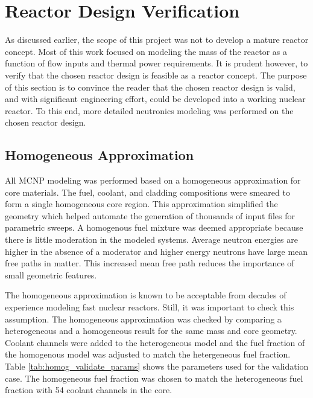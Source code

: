 \chapter{Reactor Design Verification}
    As discussed earlier, the scope of this project was not to develop a mature
reactor concept. Most of this work focused on modeling the mass of the
reactor as a function of flow inputs and thermal power requirements. It is
prudent however, to verify that the chosen reactor design is feasible as a
reactor concept. The purpose of this section is to convince the reader that
the chosen reactor design is valid, and with significant engineering effort,
could be developed into a working nuclear reactor. To this end, more detailed
neutronics modeling was performed on the chosen reactor design.

\section{Homogeneous Approximation}
All MCNP modeling was performed based on a homogeneous approximation for core
materials. The fuel, coolant, and cladding compositions were smeared to form a
single homogeneous core region. This approximation simplified the geometry which
helped automate the generation of thousands of input files for parametric
sweeps. A homogenous fuel mixture was deemed appropriate because there is little
moderation in the modeled systems. Average neutron energies are higher in the
absence of a moderator and higher energy neutrons have large mean free paths in
matter. This increased mean free path reduces the importance of small geometric
features.

The homogeneous approximation is known to be acceptable from decades of
experience modeling fast nuclear reactors. Still, it was important to check
this assumption. The homogeneous approximation was checked by comparing a
heterogeneous and a homogeneous \keff result for the same \uran mass and core
geometry. Coolant channels were added to the heterogeneous model and the fuel
fraction of the homogenous model was adjusted to match the hetergeneous fuel
fraction. Table \ref{tab:homog_validate_params} shows the parameters used for
the validation case. The homogeneous fuel fraction was chosen to match the
heterogeneous fuel fraction with 54 coolant channels in the core.

